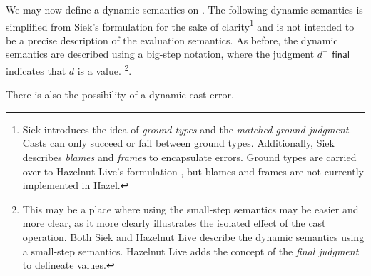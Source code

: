 We may now define a dynamic semantics on \gtclc. The following dynamic semantics is simplified from Siek's formulation for the sake of clarity\footnote{Siek \cite{siek2015refined} introduces the idea of \textit{ground types} and the \textit{matched-ground judgment}. Casts can only succeed or fail between ground types. Additionally, Siek describes \textit{blames} and \textit{frames} to encapsulate errors. Ground types are carried over to Hazelnut Live's formulation \cite{conf/popl/HazelnutLive19}, but blames and frames are not currently implemented in Hazel.} and is not intended to be a precise description of the evaluation semantics. As before, the dynamic semantics are described using a big-step notation, where the judgment $d^-\textsf{ final}$ indicates that $d$ is a value. \footnote{This may be a place where using the small-step semantics may be easier and more clear, as it more clearly illustrates the isolated effect of the cast operation. Both Siek \cite{Siek06gradualtyping,siek2015refined} and Hazelnut Live \cite{conf/popl/HazelnutLive19} describe the dynamic semantics using a small-step semantics. Hazelnut Live adds the concept of the \textit{final judgment} to delineate values.}.

\begin{singlespace}
\end{singlespace}

There is also the possibility of a dynamic cast error.

